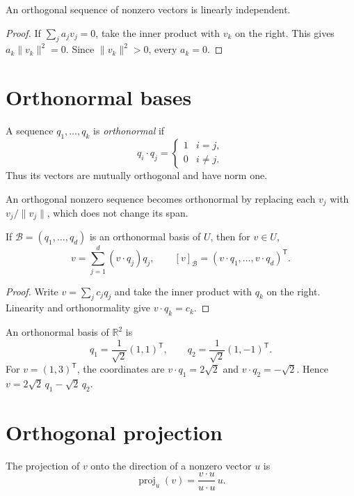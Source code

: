 \begin{proposition}
An orthogonal sequence of nonzero vectors is linearly independent.
\end{proposition}
\begin{proof}
If $\sum_j a_jv_j=0$, take the inner product with $v_k$ on the right.
This gives $a_k\|v_k\|^2=0$. Since $\|v_k\|^2>0$, every $a_k=0$.
\end{proof}

\section{Orthonormal bases}

\begin{definition}
A sequence $q_1,\ldots,q_k$ is \emph{orthonormal} if
\[
 q_i\cdot q_j=\begin{cases}1&i=j,\\0&i\ne j.\end{cases}
\]
Thus its vectors are mutually orthogonal and have norm one.
\end{definition}

An orthogonal nonzero sequence becomes orthonormal by replacing each
$v_j$ with $v_j/\|v_j\|$, which does not change its span.

\begin{theorem}
If $\mathcal B=(q_1,\ldots,q_d)$ is an orthonormal basis of $U$, then
for $v\in U$,
\[
 \boxed{v=\sum_{j=1}^d(v\cdot q_j)q_j,\qquad
 [v]_{\mathcal B}=(v\cdot q_1,\ldots,v\cdot q_d)^{\mathsf T}.}
\]
\end{theorem}
\begin{proof}
Write $v=\sum_j c_jq_j$ and take the inner product with $q_k$ on the
right. Linearity and orthonormality give $v\cdot q_k=c_k$.
\end{proof}

\begin{example}
An orthonormal basis of $\mathbb R^2$ is
\[
 q_1=\frac1{\sqrt2}(1,1)^{\mathsf T},\qquad
 q_2=\frac1{\sqrt2}(1,-1)^{\mathsf T}.
\]
For $v=(1,3)^{\mathsf T}$, the coordinates are
$v\cdot q_1=2\sqrt2$ and $v\cdot q_2=-\sqrt2$.
Hence $v=2\sqrt2\,q_1-\sqrt2\,q_2$.
\end{example}

\section{Orthogonal projection}

\begin{definition}
The projection of $v$ onto the direction of a nonzero vector $u$ is
\[
 \boxed{\operatorname{proj}_u(v)=\frac{v\cdot u}{u\cdot u}\,u.}
\]
\end{definition}

